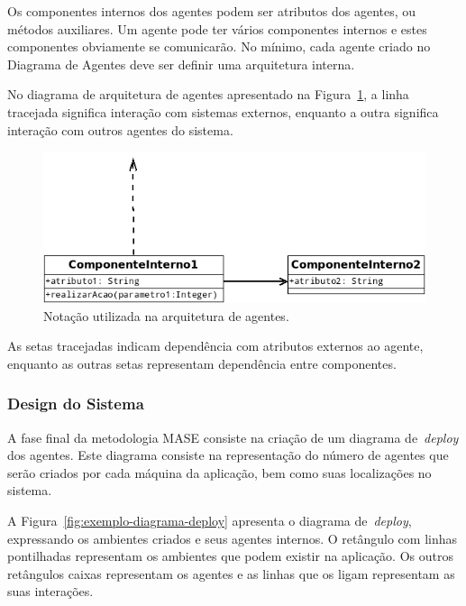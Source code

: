 Os componentes internos dos agentes podem ser atributos dos agentes, ou métodos auxiliares. Um agente pode ter vários componentes internos e estes componentes obviamente se comunicarão. No mínimo, cada agente criado no Diagrama de Agentes deve ser definir uma arquitetura interna.

No diagrama de arquitetura de agentes apresentado na Figura~\ref{fig:exemplo-diagrama-arquitetura-agentes}, a linha tracejada significa interação com sistemas externos, enquanto a outra significa interação com outros agentes do sistema.

\begin{figure}
	\centering
	\includegraphics[scale=0.65]{images/exemplo-diagrama-arquitetura-agentes.png}
	\caption{Notação utilizada na arquitetura de agentes.}
	\label{fig:exemplo-diagrama-arquitetura-agentes}
\end{figure}

As setas tracejadas indicam dependência com atributos externos ao agente, enquanto as outras setas representam dependência entre componentes.

\subsubsection{Design do Sistema}

A fase final da metodologia MASE consiste na criação de um diagrama de~\emph{deploy} dos agentes. Este diagrama consiste na representação do número de agentes que serão criados por cada máquina da aplicação, bem como suas localizações no sistema.

A Figura~\ref{fig:exemplo-diagrama-deploy} apresenta o diagrama de~\emph{deploy}, expressando os ambientes criados e seus agentes internos. O retângulo com linhas pontilhadas representam os ambientes que podem existir na aplicação. Os outros retângulos caixas representam os agentes e as linhas que os ligam representam as suas interações.

